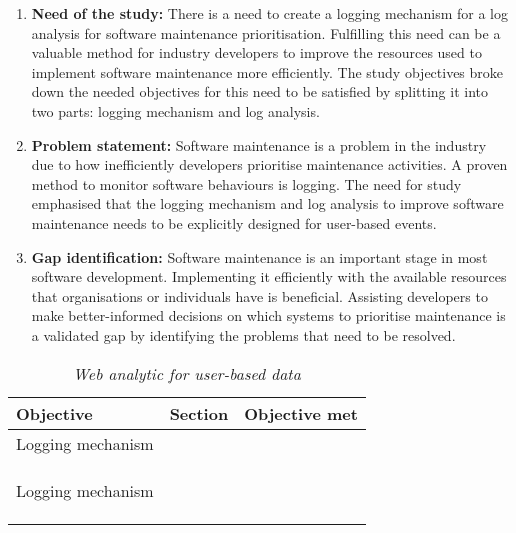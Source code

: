 \begin{enumerate}[label=\textbf{\Roman*.}]
	\item \textbf{Need of the study:} There is a need to create a logging mechanism for a log analysis for software maintenance prioritisation. Fulfilling this need can be a valuable method for industry developers to improve the resources used to implement software maintenance more efficiently. The study objectives broke down the needed objectives for this need to be satisfied by splitting it into two parts: logging mechanism and log analysis. 
	\item \textbf{Problem statement:} Software maintenance is a problem in the industry due to how inefficiently developers prioritise maintenance activities. A proven method to monitor software behaviours is logging. The need for study emphasised that the logging mechanism and log analysis to improve software maintenance needs to be explicitly designed for user-based events.
	\item \textbf{Gap identification:} Software maintenance is an important stage in most software development. Implementing it efficiently with the available resources that organisations or individuals have is beneficial. Assisting developers to make better-informed decisions on which systems to prioritise maintenance is a validated gap by identifying the problems that need to be resolved.
\end{enumerate}

\begin{table}[!htb]
	\centering
	\tablestyle[sansbold]
	\caption[Web analytic for user-based data]
	{\textit{Web analytic for user-based data}}
	\label{tbl:ch4_ValidationStart}
	\begin{tabularx}{\textwidth}{Xp{3cm}p{3cm}}
		\toprule
		\textbf{Objective}  & \textbf{Section} & \textbf{Objective met} \\ \midrule
		Logging mechanism & & \\ \midrule
		\RaggedRight \objAi & \Cref{sec:ch2_logAttributesRequirements} & \cmark \\
		\RaggedRight \objAii & \Cref{sec:ch2_logAttributesRequirements} & \cmark \\
		\RaggedRight \objAiii & \Cref{sec:ch2_logAttributesRequirements} & \cmark \\ \midrule
		Logging mechanism & & \\ \midrule
		\RaggedRight \objBi & \Cref{sec:ch2_logAttributesRequirements} & \cmark \\
		\RaggedRight \objBii & \Cref{sec:ch2_logAttributesRequirements} & \cmark \\
		\RaggedRight \objBiii & \Cref{sec:ch2_logAttributesRequirements} & \cmark \\
		\bottomrule
	\end{tabularx}
\end{table}


